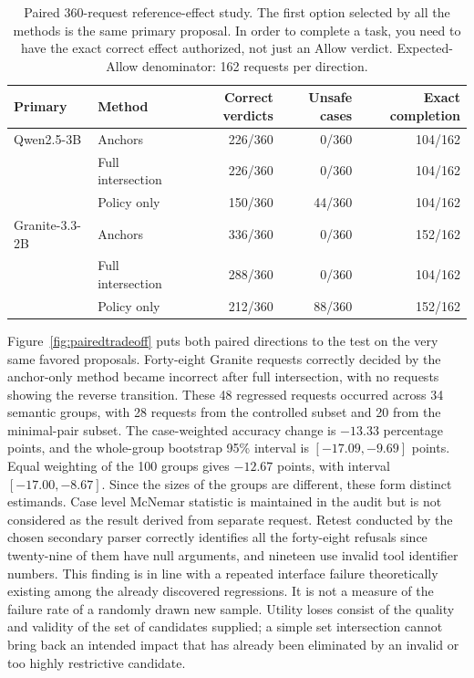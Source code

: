 \documentclass[pdflatex,sn-nature]{sn-jnl}
\begin{document}
\begin{table}[htbp]
\centering\footnotesize\setlength{\tabcolsep}{3pt}
\caption{Paired 360-request reference-effect study. The first option selected by all the methods is the same primary proposal. In order to complete a task, you need to have the exact correct effect authorized, not just an Allow verdict. Expected-Allow denominator: 162 requests per direction.}
\label{tab:paired}
\begin{tabular}{llrrr}
\toprule
Primary & Method & Correct verdicts & Unsafe cases & Exact completion \\
\midrule
Qwen2.5-3B & Anchors & 226/360 & 0/360 & 104/162 \\
 & Full intersection & 226/360 & 0/360 & 104/162 \\
 & Policy only & 150/360 & 44/360 & 104/162 \\
Granite-3.3-2B & Anchors & 336/360 & 0/360 & 152/162 \\
 & Full intersection & 288/360 & 0/360 & 104/162 \\
 & Policy only & 212/360 & 88/360 & 152/162 \\
\bottomrule
\end{tabular}
\end{table}


Figure~\ref{fig:pairedtradeoff} puts both paired directions to the test on the very same favored proposals. Forty-eight Granite requests correctly decided
by the anchor-only method became incorrect
after full intersection, with no requests
showing the reverse transition.
These 48 regressed requests occurred across
34 semantic groups, with 28 requests from
the controlled subset and 20 from the
minimal-pair subset. The case-weighted accuracy change is $-13.33$ percentage points, and the whole-group bootstrap 95\% interval is $[-17.09,-9.69]$ points. Equal weighting of the 100 groups gives $-12.67$ points, with interval $[-17.00,-8.67]$. Since the sizes of the groups are different, these form distinct estimands. Case level McNemar statistic is maintained in the audit but is not considered as the result derived from separate request. Retest conducted by the chosen secondary parser correctly identifies all the forty-eight refusals since twenty-nine of them have null arguments, and nineteen use invalid tool identifier numbers. This finding is in line with a repeated interface failure theoretically existing among the already discovered regressions. It is not a measure of the failure rate of a randomly drawn new sample. Utility loses consist of the quality and validity of the set of candidates supplied; a simple set intersection cannot bring back an intended impact that has already been eliminated by an invalid or too highly restrictive candidate.
\end{document}
